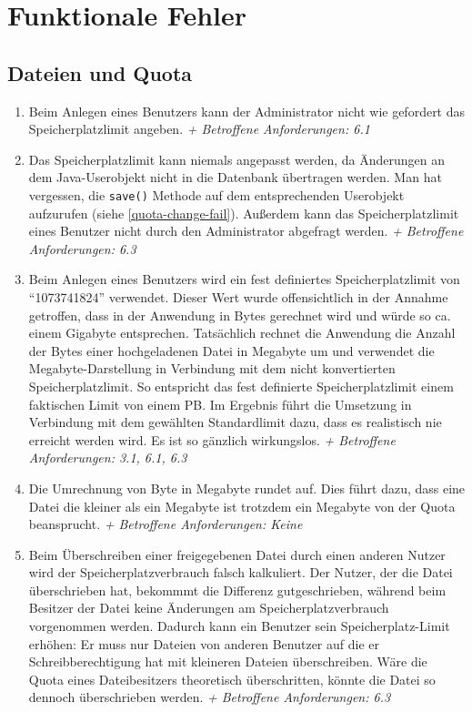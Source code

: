 \documentclass[12pt,DIV14,BCOR10mm,a4paper,parskip=half-,headsepline,headinclude,english,ngerman,bibliography=totocnumbered]{scrreprt}
\begin{document}
\chapter{Funktionale Fehler}


\section{Dateien und Quota}

\begin{enumerate}
\item Beim Anlegen eines Benutzers kann der Administrator nicht wie gefordert das Speicherplatzlimit angeben.\newline
\textit{+ Betroffene Anforderungen: 6.1}

\item Das Speicherplatzlimit kann niemals angepasst werden, da Änderungen an dem Java-Userobjekt nicht in die Datenbank übertragen werden. Man hat vergessen, die \texttt{save()} Methode auf dem entsprechenden Userobjekt aufzurufen (siehe \ref{quota-change-fail}). Außerdem kann das Speicherplatzlimit eines Benutzer nicht durch den Administrator abgefragt werden.\newline
\textit{+ Betroffene Anforderungen: 6.3}

\item Beim Anlegen eines Benutzers wird ein fest definiertes Speicherplatzlimit von \enquote{1073741824} verwendet. Dieser Wert wurde offensichtlich in der Annahme getroffen, dass in der Anwendung in Bytes gerechnet wird und würde so ca. einem Gigabyte entsprechen. Tatsächlich rechnet die Anwendung die Anzahl der Bytes einer hochgeladenen Datei in Megabyte um und verwendet die Megabyte-Darstellung in Verbindung mit dem nicht konvertierten Speicherplatzlimit. So entspricht das fest definierte Speicherplatzlimit einem faktischen Limit von einem PB. Im Ergebnis führt die Umsetzung in Verbindung mit dem gewählten Standardlimit dazu, dass es realistisch nie erreicht werden wird. Es ist so gänzlich wirkungslos.\newline
\textit{+ Betroffene Anforderungen: 3.1, 6.1, 6.3}

\item Die Umrechnung von Byte in Megabyte rundet auf. Dies führt dazu, dass eine Datei die kleiner als ein Megabyte ist trotzdem ein Megabyte von der Quota beansprucht.\newline
\textit{+ Betroffene Anforderungen: Keine}

\item Beim Überschreiben einer freigegebenen Datei durch einen anderen Nutzer wird der Speicherplatzverbrauch falsch kalkuliert. Der Nutzer, der die Datei überschrieben hat, bekommmt die Differenz gutgeschrieben, während beim Besitzer der Datei keine Änderungen am Speicherplatzverbrauch vorgenommen werden. Dadurch kann ein Benutzer sein Speicherplatz-Limit erhöhen: Er muss nur Dateien von anderen Benutzer auf die er Schreibberechtigung hat mit kleineren Dateien überschreiben. Wäre die Quota eines Dateibesitzers theoretisch überschritten, könnte die Datei so dennoch überschrieben werden.\newline
\textit{+ Betroffene Anforderungen: 6.3}


\end{enumerate}
\end{document}
